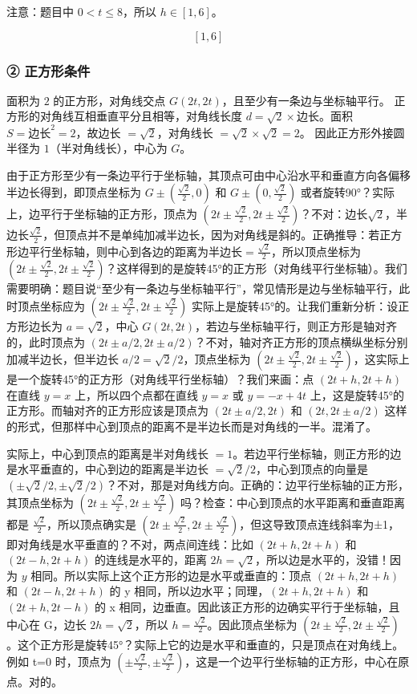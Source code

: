 注意：题目中 \(0 < t \le 8\)，所以 \(h \in [1, 6]\)。

\[
\boxed{[1,6]}
\]

\subsubsection*{② 正方形条件}

面积为 \(2\) 的正方形，对角线交点 \(G(2t,2t)\)，且至少有一条边与坐标轴平行。  
正方形的对角线互相垂直平分且相等，对角线长度 \(d = \sqrt{2} \times \text{边长}\)。面积 \(S = \text{边长}^2 = 2\)，故边长 \(= \sqrt{2}\)，对角线长 \(= \sqrt{2} \times \sqrt{2} = 2\)。  
因此正方形外接圆半径为 \(1\)（半对角线长），中心为 \(G\)。

由于正方形至少有一条边平行于坐标轴，其顶点可由中心沿水平和垂直方向各偏移半边长得到，即顶点坐标为 \(G \pm (\frac{\sqrt{2}}{2}, 0)\) 和 \(G \pm (0, \frac{\sqrt{2}}{2})\) 或者旋转90°？实际上，边平行于坐标轴的正方形，顶点为 \((2t \pm \frac{\sqrt{2}}{2}, 2t \pm \frac{\sqrt{2}}{2})\)？不对：边长\(\sqrt{2}\)，半边长\(\frac{\sqrt{2}}{2}\)，但顶点并不是单纯加减半边长，因为对角线是斜的。正确推导：若正方形边平行坐标轴，则中心到各边的距离为半边长\(=\frac{\sqrt{2}}{2}\)，所以顶点坐标为 \((2t \pm \frac{\sqrt{2}}{2}, 2t \pm \frac{\sqrt{2}}{2})\)？这样得到的是旋转45°的正方形（对角线平行坐标轴）。我们需要明确：题目说“至少有一条边与坐标轴平行”，常见情形是边与坐标轴平行，此时顶点坐标应为 \((2t \pm \frac{\sqrt{2}}{2}, 2t \pm \frac{\sqrt{2}}{2})\) 实际上是旋转45°的。让我们重新分析：设正方形边长为 \(a = \sqrt{2}\)，中心 \(G(2t,2t)\)，若边与坐标轴平行，则正方形是轴对齐的，此时顶点为 \((2t \pm a/2, 2t \pm a/2)\)？不对，轴对齐正方形的顶点横纵坐标分别加减半边长，但半边长 \(a/2 = \sqrt{2}/2\)，顶点坐标为 \((2t \pm \frac{\sqrt{2}}{2}, 2t \pm \frac{\sqrt{2}}{2})\)，这实际上是一个旋转45°的正方形（对角线平行坐标轴）？我们来画：点 \((2t + h, 2t + h)\) 在直线 \(y=x\) 上，所以四个点都在直线 \(y=x\) 或 \(y=-x+4t\) 上，这是旋转45°的正方形。而轴对齐的正方形应该是顶点为 \((2t \pm a/2, 2t)\) 和 \((2t, 2t \pm a/2)\) 这样的形式，但那样中心到顶点的距离不是半边长而是对角线的一半。混淆了。

实际上，中心到顶点的距离是半对角线长 \(=1\)。若边平行坐标轴，则正方形的边是水平垂直的，中心到边的距离是半边长 \(=\sqrt{2}/2\)，中心到顶点的向量是 \((\pm \sqrt{2}/2, \pm \sqrt{2}/2)\)？不对，那是对角线方向。正确的：边平行坐标轴的正方形，其顶点坐标为 \((2t \pm \frac{\sqrt{2}}{2}, 2t \pm \frac{\sqrt{2}}{2})\) 吗？检查：中心到顶点的水平距离和垂直距离都是 \(\frac{\sqrt{2}}{2}\)，所以顶点确实是 \((2t \pm \frac{\sqrt{2}}{2}, 2t \pm \frac{\sqrt{2}}{2})\)，但这导致顶点连线斜率为±1，即对角线是水平垂直的？不对，两点间连线：比如 \((2t + h, 2t + h)\) 和 \((2t - h, 2t + h)\) 的连线是水平的，距离 \(2h = \sqrt{2}\)，所以边是水平的，没错！因为 \(y\) 相同。所以实际上这个正方形的边是水平或垂直的：顶点 \((2t+h, 2t+h)\) 和 \((2t-h, 2t+h)\) 的 y 相同，所以边水平；同理，\((2t+h, 2t+h)\) 和 \((2t+h, 2t-h)\) 的 x 相同，边垂直。因此该正方形的边确实平行于坐标轴，且中心在 G，边长 \(2h = \sqrt{2}\)，所以 \(h = \frac{\sqrt{2}}{2}\)。因此顶点坐标为 \((2t \pm \frac{\sqrt{2}}{2}, 2t \pm \frac{\sqrt{2}}{2})\)。这个正方形是旋转45°？实际上它的边是水平和垂直的，只是顶点在对角线上。例如 t=0 时，顶点为 \((\pm \frac{\sqrt{2}}{2}, \pm \frac{\sqrt{2}}{2})\)，这是一个边平行坐标轴的正方形，中心在原点。对的。

